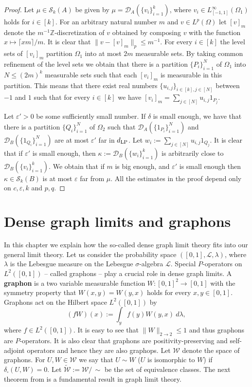 \documentclass[a4wider]{amsart}
\theoremstyle{definitionbreak}\newtheorem{D}[theorem]{Definition}
\theoremstyle{definitionbreak}\newtheorem*{D*}{Definition}
\begin{document}
\begin{proof} Let $\mu\in\mathcal{S}_k(A)$ be given by $\mu=\mathcal{D}_A(\{v_i\}_{i=1}^k)$, where $v_i\in L^\infty_{[-1,1]}(\Omega_1)$ holds for $i\in [k]$. For an arbitrary natural number $m$ and $v\in L^p(\Omega)$ let $[v]_m$ denote the $m^{-1}\mathbb{Z}$-discretization of $v$ obtained by composing $v$ with the function $x\mapsto \lceil xm\rceil/m$. It is clear that $\|v-[v]_m\|_p\leq m^{-1}$. For every $i\in[k]$ the level sets of $[v_i]_m$ partition $\Omega_1$ into at most $2m$ measurable sets. By taking common refinement of the level sets we obtain that there is a partition $\{P_i\}_{i=1}^N$ of $\Omega_1$ into $N\leq (2m)^k$ measurable sets such that each $[v_i]_m$ is measurable in this partition. This means that there exist real numbers $\{u_{i,j}\}_{i\in [k],j\in[N]}$ between $-1$ and $1$ such that for every $i\in[k]$ we have $[v_i]_m=\sum_{j\in [N]}u_{i,j}1_{P_j}$. 

Let $\varepsilon'>0$ be some sufficiently small number. If $\delta$ is small enough, we have that there is a partition $\{Q_i\}_{i=1}^N$ of $\Omega_2$ such that $\mathcal{D}_A(\{1_{P_i}\}_{i=1}^N)$ and $\mathcal{D}_B(\{1_{Q_i}\}_{i=1}^N)$ are at most $\varepsilon'$ far in $d_{\rm LP}$. Let $w_i:=\sum_{j\in [N]}u_{i,j}1_{Q_j}$. It is clear that if $\varepsilon'$ is small enough, then $\kappa:=\mathcal{D}_B(\{w_i\}_{i=1}^k)$ is arbitrarily close to $\mathcal{D}_B(\{v_i\}_{i=1}^k)$. We obtain that if $m$ is big enough, and $\varepsilon'$ is small enough then $\kappa\in\mathcal{S}_k(B)$ is at most $\varepsilon$ far from $\mu$. All the estimates in the proof depend only on $c,\varepsilon,k$ and $p,q$.

\end{proof}







\section{Dense graph limits and graphons}

In this chapter we explain how the so-called dense graph limit theory fits into our general limit theory. Let us consider the probability space $([0,1],\mathcal{L},\lambda)$, where $\lambda$ is the Lebesgue measure on the Lebesgue $\sigma$-algebra $\mathcal{L}$. Special $P$-operators on $L^2([0,1])$ -- called graphons -- play a crucial role in dense graph limits. A {\bf graphon} is a two variable measurable function $W:[0,1]^2\to [0,1]$ with the symmetry property that $W(x,y)=W(y,x)$ holds for every $x,y\in [0,1]$. Graphons act on the Hilbert space $L^2([0,1])$ by 
$$(fW)(x):=\int_y f(y)W(y,x)~d\lambda,$$ where $f\in L^2([0,1])$. It is easy to see that $\|W\|_{2\to 2}\leq 1$ and thus graphons are $P$-operators. It is also clear that graphons are positivity-preserving and self-adjoint operators and hence they are also graphops. Let $\mathcal{W}$ denote the space of graphons. For $U,W\in\mathcal{W}$ we say that $U\sim W$ ($U$ is isomorphic to $W$) if $\delta_\square(U,W)=0$. Let $\tilde{\mathcal{W}}:=\mathcal{W}/\,\sim$ be the set of equivalence classes. The next theorem from \cite{LSz} is a fundamental result in graph limit theory.
\end{document}
